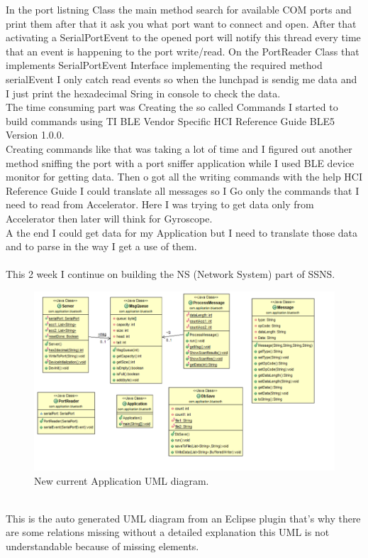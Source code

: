 \documentclass[conference,12pt]{IEEETran}
\begin{document}
In the port listning Class the main method search for available COM ports and print them after that it ask you what port want to connect and open. After that activating a SerialPortEvent to the opened port will notify this thread every time that an event is happening to the port write/read.
On the PortReader Class that implements SerialPortEvent Interface implementing the required method serialEvent I only catch read events so when the lunchpad is sendig me data and I just print the hexadecimal Sring in console to check the data.\\
The time consuming part was Creating the so called Commands I started to build commands using TI BLE Vendor Specific HCI Reference Guide BLE5 Version 1.0.0.\\
Creating commands like that was taking a lot of time and I figured out another method sniffing the port with a port sniffer application while I used BLE device monitor for getting data.
Then o got all the writing commands with the help HCI Reference Guide I could translate all messages so I Go only the commands that I need to read from Accelerator. Here I was trying to get data only from Accelerator then later will think for Gyroscope.\\
A the end I could get data for my Application but I need to translate those data and to parse in the way I get a use of them.\\\\
This 2 week I continue on building the NS (Network System) part of SSNS.\\
\begin{figure}[!h]
	\centering
	\includegraphics[scale=0.40]{images/UML2.png}
	\caption{New current Application UML diagram.}
	\label{img:UML2}
\end{figure}
\\This is the auto generated UML diagram from an Eclipse plugin that's why there are some relations missing without a detailed explanation this UML is not understandable because of missing elements.
\end{document}
